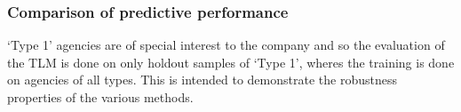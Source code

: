 \documentclass[ba]{imsart}
\begin{document}
\subsubsection{Comparison of predictive performance}
`Type 1' agencies are of special interest to the company and so the evaluation of the TLM is done on only holdout samples of `Type 1', wheres the training is done on agencies of all types. This is intended to demonstrate the robustness properties of the various methods. 
\end{document}
